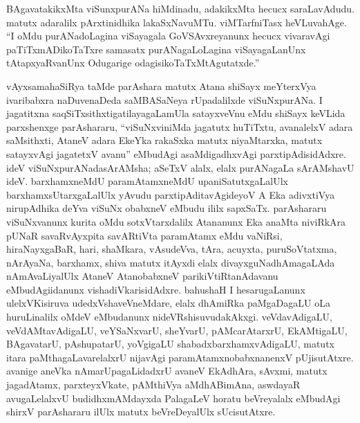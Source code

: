 BAgavatakikxMta viSunxpurANa hiMdinadu, adakikxMta hecucx saraLavAdudu. matutx adaralilx pArxtinidhika lakaSxNavuMTu. viMTarfniTasx heVLuvahAge. ``I oMdu purANa\-doLagina viSayagala GoVSAvxreyanunx hecucx vivaravAgi paTiTxmADikoTaTxre samasatx purANagaLoLagina viSayagaLanUnx tAtapxyaRvanUnx Odugarige odagisikoTaTxMtAgu\-tatxde.''

vAyxsamahaSiRya taMde parAshara matutx Atana shiSayx meYterxVya ivaribabxra naDuve\break naDeda saMBASaNeya rUpadalilxde viSuNxpurANa. I jagatitxna saqSiTxsithxtigatilayagaLa\break mUla satayxveVnu eMdu shiSayx keVLida parxshenxge parAshararu, ``viSuNxviniMda jagatutx huTiTxtu, avanalelxV adara saMsithxti, AtaneV adara EkeYka rakaSxka matutx niyaMtarxka, matutx satayx\-vAgi jagatetxV avanu'' eMbudAgi asaMdigadhxvAgi parxtipAdisidAdxre. ideV viSuNxpurANada\break sArAMsha; aSeTxV alalx, elalx purANagaLa sArAMshavU ideV. barxhamxneMdU paramAtamx\-neMdU upaniSatutxgaLalUlx barxhamxsUtarxgaLalUlx yAvudu parxtipAditavAgideyoV A Eka adivxtiVya nirupAdhika deYva viSuNx obabxneV eMbudu ililx sapxSaTx. parAshararu viSuNx\-vanunx kurita oMdu sotxVtarxdalilx Atananunx Eka anaMta niviRkAra pUNaR savaR\-vAyxpita savARtiVta paramAtamx eMdu vaNiRsi, hiraNayxgaBaR, hari, shaMkara, vAsudeVva, tAra, acuyxta, puruSoVtatxma, nArAyaNa, barxhamx, shiva matutx itAyxdi elalx divayxguNa\-dhAma\break\-gaLAda nAmAvaLiyalUlx AtaneV AtanobabxneV parikiVtiRtanAdavanu eMbudAgi\break idanunx vishadiVkarisidAdxre. bahushaH I hesarugaLanunx ulelxVKisiruva udedxVsha\break\-veVneMdare, elalx dhAmiRka paMgaDagaLU oLa huruLinalilx oMdeV eMbudanunx nideVR\-shisuvudakAkxgi. veVdavAdigaLU, veVdAMtavAdigaLU, veYSaNxvarU, sheYvarU, pAMca\-rAtarxrU, EkAMtigaLU, BAgavatarU, pAshupatarU, yoVgigaLU shabadxbarxhamxvAdi\-gaLU, matutx itara paMthagaLavarelalxrU nijavAgi paramAtamxnobabxnanenxV pUjisutAtxre. avanige aneVka nAmarUpagaLidadxrU avaneV EkAdhAra, sAvxmi, matutx jagadAtamx, parxteyxVkate, pAMthiVya aMdhABimAna, aswdayaR avugaLelalxvU budidhxmAMdayxda PalagaLeV horatu beVreyalalx eMbudAgi shirxV parAshararu ilUlx matutx beVreDeyalUlx sUcisutAtxre.

